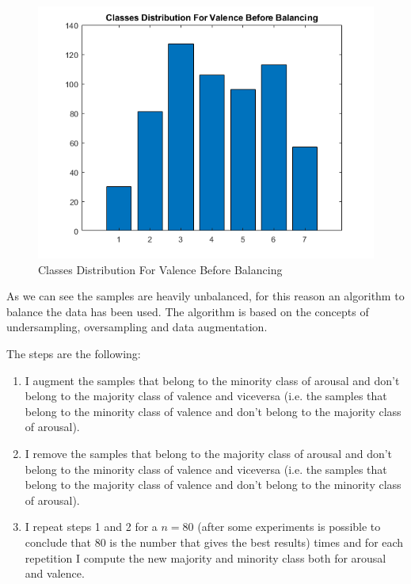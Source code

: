 \documentclass[a4paper]{report}
\begin{document}
	\begin{figure}[htpb]
		\centering
		\includegraphics[scale=0.7]{img/beforeBalancingValence.png}
		\caption{Classes Distribution For Valence Before Balancing}
		\label{beforeBalancingValence}
	\end{figure}


\noindent As we can see the samples are heavily unbalanced, for this reason an algorithm to balance the data has been used. The algorithm is based on the concepts of undersampling, oversampling and data augmentation.

\noindent The steps are the following:
\begin{enumerate}
	\item I augment the samples that belong to the minority class of arousal 
	 and don't belong to the majority class of valence and viceversa (i.e. the samples that 
	 belong to the minority class of valence and don't belong to the majority
	 class of arousal).
	 
	 \item I remove the samples that belong to the majority class of 
	 arousal and don't belong to the minority class of valence and viceversa (i.e. the
	 samples that belong to the majority class of valence and don't belong to
	 the minority class of arousal).
	
	 \item I repeat steps 1 and 2 for a $n=80$ (after some experiments is possible to conclude that $80$ is the number that gives the best results) times and for each repetition I compute the new majority and minority class both for arousal and valence.
	 
\end{enumerate}
\end{document}
